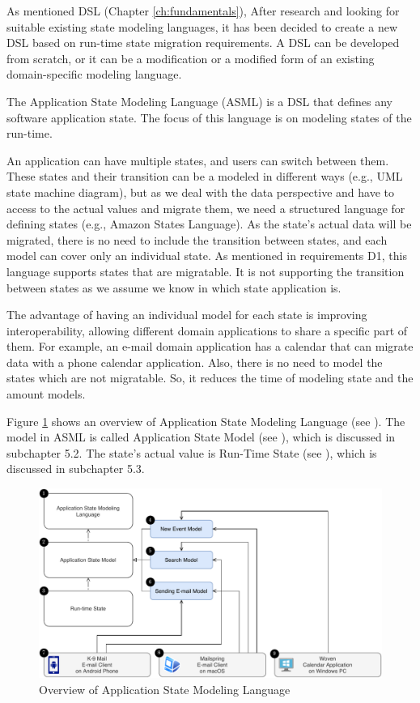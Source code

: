As mentioned DSL (Chapter \ref{ch:fundamentals}), After research and looking for suitable existing state modeling languages, it has been decided to create a new DSL based on run-time state migration requirements.
A DSL can be developed from scratch, or it can be a modification or a modified form of an existing domain-specific modeling language.

The Application State Modeling Language (ASML) is a DSL that defines any software application state.
The focus of this language is on modeling states of the run-time.

An application can have multiple states, and users can switch between them.
These states and their transition can be a modeled in different ways (e.g., UML state machine diagram), but as we deal with the data perspective and have to access to the actual values and migrate them, we need a structured language for defining states (e.g., Amazon States Language). As the state’s actual data will be migrated, there is no need to include the transition between states, and each model can cover only an individual state. As mentioned in requirements D1, this language supports states that are migratable.
It is not supporting the transition between states as we assume we know in which state application is. 

The advantage of having an individual model for each state is improving interoperability, allowing different domain applications to share a specific part of them.
For example, an e-mail domain application has a calendar that can migrate data with a phone calendar application.
Also, there is no need to model the states which are not migratable. So, it reduces the time of modeling state and the amount models. 

Figure \ref{fig:asml-overview} shows an overview of Application State Modeling Language (see \fcircone). The model in ASML is called Application State Model (see \fcirctwo), which is discussed in subchapter 5.2. The state’s actual value is Run-Time State (see \fcircthree), which is discussed in subchapter 5.3.

\begin{figure}
    \includegraphics[scale=0.75]{../figures/asml-overview}
    \centering
    \caption{Overview of Application State Modeling Language}
    \label{fig:asml-overview}
\end{figure}

